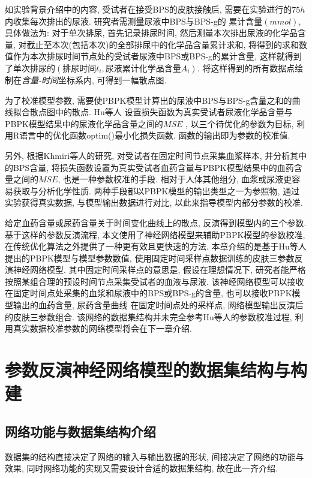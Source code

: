 \documentclass[a4paper,punct=banjiao,twoside]{ctexrep}
\theoremstyle{plain}
\theoremstyle{definition}
\theoremstyle{remark}
\begin{document}
如实验背景介绍中的内容, 受试者在接受BPS的皮肤接触后, 需要在实验进行的$75h$内收集每次排出的尿液\cite{11}. 研究者需测量尿液中BPS与BPS-g的
累计含量$(mmol)$, 具体做法为: 对于单次排尿, 首先记录排尿时间, 然后测量本次排出尿液的化学品含量, 对截止至本次(包括本次)的全部排尿中的化学品含量累计求和, 
将得到的求和数值作为本次排尿时间节点处的受试者尿液中BPS或BPS-g的累计含量, 这样就得到了单次排尿的$(\textit{排尿时间}t_i, \textit{尿液累计化学品含量}A_i)$. 
将这样得到的所有数据点绘制在\textit{含量-时间}坐标系内, 可得到一幅散点图. 

为了校准模型参数, 需要使PBPK模型计算出的尿液中BPS与BPS-g含量之和的曲线拟合散点图中的散点. Hu等人\cite{11} 设置损失函数为真实受试者尿液化学品含量与PBPK模型结果中的尿液化学品含量之间的$MSE$
, 以三个待优化的参数为目标, 利用R语言中的优化函数optim()最小化损失函数. 函数的输出即为参数的校准值. 

另外, 根据Khmiri等人\cite{13}的研究, 对受试者在固定时间节点采集血浆样本, 并分析其中的BPS含量, 将损失函数设置为真实受试者血药含量与PBPK模型结果中的血药含量之间的$MSE$, 也是一种参数校准的手段.
相对于人体其他组分, 血浆或尿液更容易获取与分析化学性质. 两种手段都以PBPK模型的输出类型之一为参照物, 通过实验获得真实数据, 与模型输出数据进行对比, 以此来指导模型内部分参数的校准.

给定血药含量或尿药含量关于时间变化曲线上的散点, 反演得到模型内的三个参数. 基于这样的参数反演流程, 本文使用了神经网络模型来辅助PBPK模型的参数校准, 在传统优化算法之外提供了一种更有效且更快速的方法.
本章介绍的是基于Hu等人\cite{11}提出的PBPK模型与模型参数数值, 使用固定时间采样点数据训练的皮肤三参数反演神经网络模型. 其中固定时间采样点的意思是, 
假设在理想情况下, 研究者能严格按照某组合理的预设时间节点采集受试者的血液与尿液. 该神经网络模型可以接收在固定时间点处采集的血浆和尿液中的BPS或BPS-g的含量, 也可以接收PBPK模型输出的血药含量, 尿药含量曲线
在固定时间点处的采样点, 网络模型输出反演后的皮肤三参数组合. 该网络的数据集结构并未完全参考Hu等人\cite{11}的参数校准过程, 利用真实数据校准参数的网络模型将会在下一章介绍.

\section{参数反演神经网络模型的数据集结构与构建}
\label{3.2}

\subsection{网络功能与数据集结构介绍}
数据集的结构直接决定了网络的输入与输出数据的形状, 间接决定了网络的功能与效果, 同时网络功能的实现又需要设计合适的数据集结构, 故在此一齐介绍.
\end{document}
